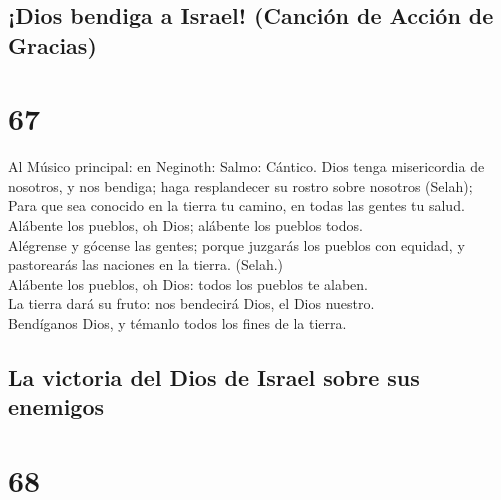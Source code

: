 \hypertarget{dios-bendiga-a-israel-canciuxf3n-de-acciuxf3n-de-gracias}{%
\subsection{¡Dios bendiga a Israel! (Canción de Acción de
Gracias)}\label{dios-bendiga-a-israel-canciuxf3n-de-acciuxf3n-de-gracias}}

\hypertarget{section-19-67}{%
\section{67}\label{section-19-67}}

 Al Músico principal: en Neginoth: Salmo: Cántico. Dios
tenga misericordia de nosotros, y nos bendiga; haga resplandecer su
rostro sobre nosotros (Selah);\\
 Para que sea conocido en la tierra tu camino, en todas
las gentes tu salud.\\
 Alábente los pueblos, oh Dios; alábente los pueblos
todos.\\
 Alégrense y gócense las gentes; porque juzgarás los
pueblos con equidad, y pastorearás las naciones en la tierra. (Selah.)\\
 Alábente los pueblos, oh Dios: todos los pueblos te
alaben.\\
 La tierra dará su fruto: nos bendecirá Dios, el Dios
nuestro.\\
 Bendíganos Dios, y témanlo todos los fines de la tierra.

\hypertarget{la-victoria-del-dios-de-israel-sobre-sus-enemigos}{%
\subsection{La victoria del Dios de Israel sobre sus
enemigos}\label{la-victoria-del-dios-de-israel-sobre-sus-enemigos}}

\hypertarget{section-19-68}{%
\section{68}\label{section-19-68}}

